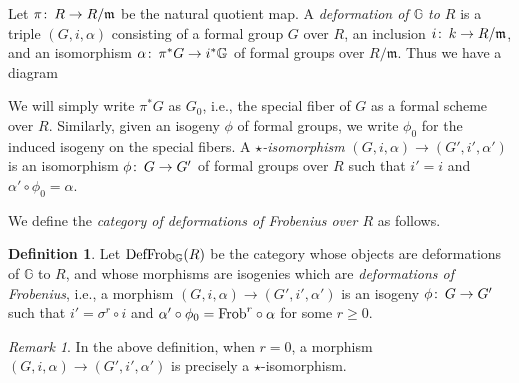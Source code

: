 \documentclass{gtpart}
\theoremstyle{definition}
\newtheorem{defn}[thm]{Definition}
\theoremstyle{remark}
\newtheorem{rmk}[thm]{Remark}
\def\co{\colon\thinspace}
\newcommand{\mb}[1]{\mathbb{#1}}
\newcommand{\mf}[1]{\mathfrak{#1}}
\newcommand{\Spec}{{\rm Spec\thinspace}}
\newcommand{\Frob}{{\rm Frob}}
\newcommand{\DF}{{{\rm DefFrob}_\BG}}
\newcommand{\BG}{{\mb G}}
\newcommand{\fm}{{\mf m}}
\newcommand{\A}{\alpha}
\numberwithin{equation}{section}
\numberwithin{thm}{section}
\begin{document}
Let $\pi \co R \to R/\fm$ be the natural quotient map.  A 
{\em deformation of $\BG$ to $R$} is a triple $(G,i,\A)$ consisting of a 
formal group $G$ over $R$, an inclusion $i \co k \to R/\fm$, and an 
isomorphism $\A \co \pi^*G \to i^*\BG$ of formal groups over $R/\fm$.  
Thus we have a diagram 
\begin{center}
\end{center}
We will simply write $\pi^*G$ as $G_0$, i.e., the special fiber of $G$ 
as a formal scheme over $R$.  Similarly, given an isogeny $\phi$ of 
formal groups, we write $\phi_0$ for the induced isogeny on the special 
fibers.  A {\em $\star$-isomorphism} $(G,i,\A) \to (G',i',\A')$ is an 
isomorphism $\phi \co G \to G'$ of formal groups over $R$ such that 
$i' = i$ and $\A' \circ \phi_0 = \A$.  

We define the {\em category of deformations of Frobenius over $R$} as 
follows.  

\begin{defn}
\label{def:DF}
 Let $\DF(R)$ be the category whose objects are deformations of $\BG$ to 
 $R$, and whose morphisms are isogenies which are {\em deformations of 
 Frobenius}, i.e., a morphism $(G,i,\A) \to (G',i',\A')$ is an isogeny 
 $\phi \co G \to G'$ such that $i' = \sigma^r \circ i$ and 
 $\A' \circ \phi_0 = \Frob^r \circ \A$ for some $r \geq 0$.  
\end{defn}

\begin{rmk}
\label{rmk:star}
 In the above definition, when $r = 0$, a morphism 
 $(G,i,\A) \to (G',i',\A')$ is precisely a $\star$-isomorphism.  
\end{rmk}
\end{document}
